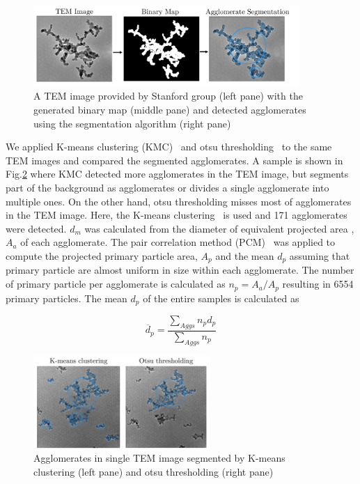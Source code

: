 \begin{figure}[H]
	\centering
	\includegraphics[width=0.9\textwidth]{Figures/Results/Shocktube/Stanford/TEM/binarymapprocess.pdf}
	\caption{A TEM image provided by Stanford group (left pane) with the generated binary map (middle pane) and detected agglomerates using the segmentation algorithm (right pane)}
	\label{fig:shocktubest_binarymapprocess} 
\end{figure}

We applied K-means clustering (KMC)~\citep{sipkens2021using} and otsu thresholding~\citep{dastanpour2016automated} to the same TEM images and compared the segmented agglomerates. A sample is shown in Fig.\ref{fig:shocktubest_aggseg_compare} where  KMC detected more agglomerates in the TEM image, but segments part of the background as agglomerates or divides a single agglomerate into multiple ones. On the other hand, otsu thresholding misses most of agglomerates in the TEM image. Here, the  K-means clustering~\citep{sipkens2021using} is used and 171 agglomerates were detected. $d_m$ was calculated from the diameter of equivalent projected area , $A_a$ of each agglomerate. The pair correlation method (PCM)~\citep{dastanpour2016automated} was applied to compute the projected primary particle area, $A_p$ and the mean $d_p$ assuming that primary particle are almost uniform in size within each agglomerate. The number of primary particle per agglomerate is calculated as $n_p=A_a/A_p$ resulting in 6554 primary particles. The mean $d_p$ of the entire samples is calculated as 

\begin{equation}
	\overline{d}_{p} = \frac{\sum_{Aggs} n_p d_p}{\sum_{Aggs} n_p} 
	\label{eqn:meandp}
\end{equation}


\begin{figure}[H]
	\centering
	\includegraphics[width=0.6\textwidth]{Figures/Results/Shocktube/Stanford/TEM/aggseg_compare.pdf}
	\caption{Agglomerates in single TEM image segmented by K-means clustering (left pane) and otsu thresholding (right pane)}
	\label{fig:shocktubest_aggseg_compare} 
\end{figure}


